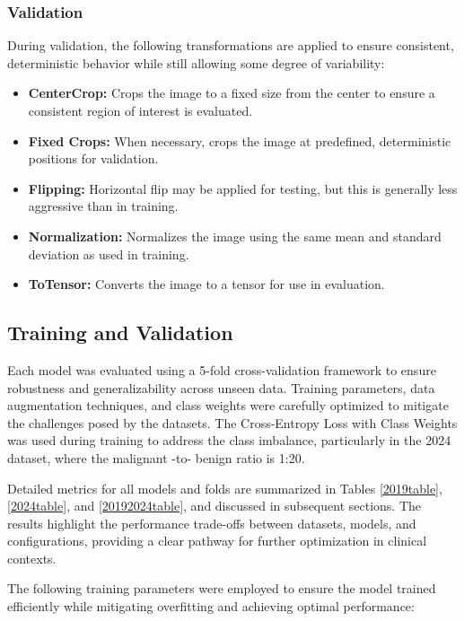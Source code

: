 \documentclass{article}
\begin{document}
\subsubsection{Validation}

During validation, the following transformations are applied to ensure consistent, deterministic behavior while
still allowing some degree of variability:

\begin{itemize}

\item \textbf{CenterCrop:} Crops the image to a fixed size from the center to ensure a consistent region of interest is
evaluated.
\item \textbf{Fixed Crops:} When necessary, crops the image at predefined, deterministic positions for validation.
\item \textbf{Flipping:} Horizontal flip may be applied for testing, but this is generally less aggressive than in
training.
\item \textbf{Normalization:} Normalizes the image using the same mean and standard deviation as used in training.
\item \textbf{ToTensor:} Converts the image to a tensor for use in evaluation.

\end{itemize}

\subsection{Training and Validation}

Each model was evaluated using a 5-fold cross-validation framework to ensure robustness and generalizability
across unseen data. Training parameters, data augmentation techniques, and class weights were carefully
optimized to mitigate the challenges posed by the datasets. The Cross-Entropy Loss with Class Weights was
used during training to address the class imbalance, particularly in the 2024 dataset, where the malignant -to-
benign ratio is 1:20.

Detailed metrics for all models and folds are summarized in Tables \ref{2019table}, \ref{2024table}, and \ref{20192024table}, and discussed in subsequent
sections. The results highlight the performance trade-offs between datasets, models, and configurations,
providing a clear pathway for further optimization in clinical contexts.

The following training parameters were employed to ensure the model trained efficiently while mitigating
overfitting and achieving optimal performance:
\end{document}
